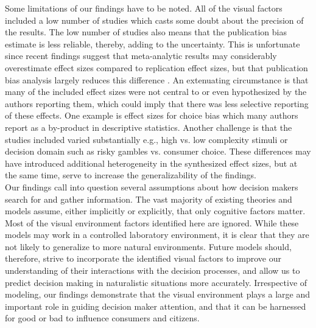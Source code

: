 \documentclass[english,natbib,man,floatsintext]{apa6}
\begin{document}
Some limitations of our findings have to be noted. All of the visual factors included a low number of studies which casts some doubt about the precision of the results. The low number of studies also means that the publication bias estimate is less reliable, thereby, adding to the uncertainty. This is unfortunate since recent findings suggest that meta-analytic results may considerably overestimate effect sizes compared to replication effect sizes, but that publication bias analysis largely reduces this difference \citep{kvarven2020}. An extenuating circumstance is that many of the included effect sizes were not central to or even hypothesized by the authors reporting them, which could imply that there was less selective reporting of these effects. One example is effect sizes for choice bias which many authors report as a by-product in descriptive statistics. Another challenge is that the studies included varied substantially e.g., high vs. low complexity stimuli or decision domain such as risky gambles vs. consumer choice. These differences may have introduced additional heterogeneity in the synthesized effect sizes, but at the same time, serve to increase the generalizability of the findings.\\ 

Our findings call into question several assumptions about how decision makers search for and gather information. The vast majority of existing theories and models assume, either implicitly or explicitly, that only cognitive factors matter. Most of the visual environment factors identified here are ignored. While these models may work in a controlled laboratory environment, it is clear that they are not likely to generalize to more natural environments. Future models should, therefore, strive to incorporate the identified visual factors to improve our understanding of their interactions with the decision processes, and allow us to predict decision making in naturalistic situations more accurately. Irrespective of modeling, our findings demonstrate that the visual environment plays a large and important role in guiding decision maker attention, and that it can be harnessed for good or bad to influence consumers and citizens.  


\end{document}
